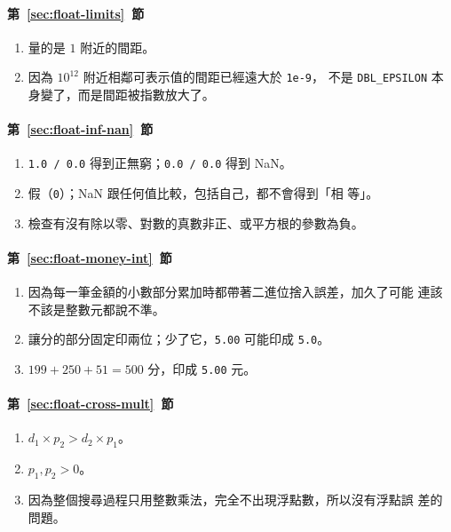 \paragraph{第~\ref{sec:float-limits}~節}
\begin{enumerate}
\item 量的是 $1$ 附近的間距。
\item 因為 $10^{12}$ 附近相鄰可表示值的間距已經遠大於 \texttt{1e-9}，
不是 \texttt{DBL\_EPSILON} 本身變了，而是間距被指數放大了。
\end{enumerate}

\paragraph{第~\ref{sec:float-inf-nan}~節}
\begin{enumerate}
\item \texttt{1.0 / 0.0} 得到正無窮；\texttt{0.0 / 0.0} 得到 NaN。
\item 假（\texttt{0}）；NaN 跟任何值比較，包括自己，都不會得到「相
等」。
\item 檢查有沒有除以零、對數的真數非正、或平方根的參數為負。
\end{enumerate}

\paragraph{第~\ref{sec:float-money-int}~節}
\begin{enumerate}
\item 因為每一筆金額的小數部分累加時都帶著二進位捨入誤差，加久了可能
連該不該是整數元都說不準。
\item 讓分的部分固定印兩位；少了它，\texttt{5.00} 可能印成
\texttt{5.0}。
\item $199 + 250 + 51 = 500$ 分，印成 \texttt{5.00} 元。
\end{enumerate}

\paragraph{第~\ref{sec:float-cross-mult}~節}
\begin{enumerate}
\item $d_1 \times p_2 > d_2 \times p_1$。
\item $p_1, p_2 > 0$。
\item 因為整個搜尋過程只用整數乘法，完全不出現浮點數，所以沒有浮點誤
差的問題。
\end{enumerate}

